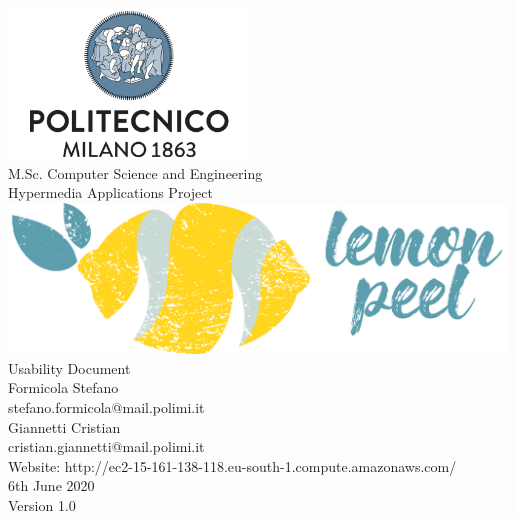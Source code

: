 \documentclass{report}
\begin{document}
	\begin{titlepage}
		\centering
		\vfill
		{
			\includegraphics[width =\linewidth, height = 4cm, keepaspectratio]{PolitecnicoLogo.png}
			\label{fig:PolitecnicoLogo}
			\large \\[2ex]M.Sc. Computer Science and Engineering\\
			\large Hypermedia Applications Project\\[12ex]
			\includegraphics[width =\linewidth, height = 4cm, keepaspectratio]{LemonPeelLogo.png}\\[12ex]

			\huge Usability Document\\[2ex]

			\normalsize Formicola Stefano\\[0.5ex]
			\normalsize stefano.formicola@mail.polimi.it\\[1.5ex]
			\normalsize Giannetti Cristian\\[0.5ex]
			\normalsize cristian.giannetti@mail.polimi.it\\[1.5ex]
			\normalsize Website: http://ec2-15-161-138-118.eu-south-1.compute.amazonaws.com/\\[1.5ex]
			\normalsize 6th June 2020\\[1.5ex]
			\normalsize Version 1.0
		}

	\end{titlepage}

	\newpage

	
	\addtocounter{page}{1}

	\clearpage
	\tableofcontents
	\thispagestyle{fancy}
	
	\newpage
	
	
	
	
	
	
	\thispagestyle{fancy}
	
\end{document}
